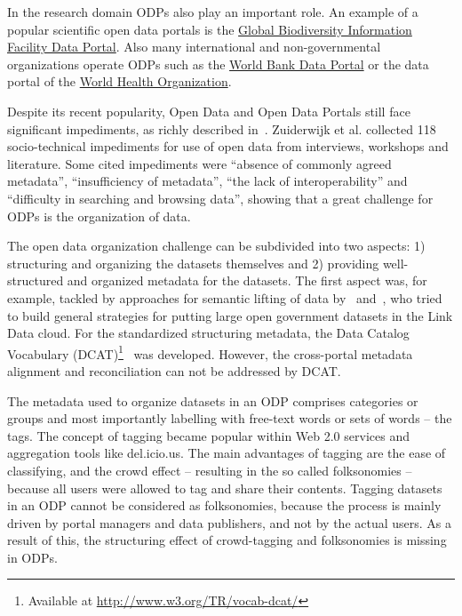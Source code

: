 \documentclass[conference]{IEEEtran}
\begin{document}
In the research domain ODPs also play an important role.
An example of a popular scientific open data portals is the \href{http://data.gbif.org}{Global Biodiversity Information Facility Data Portal}.
Also many international and non-governmental organizations operate ODPs such as the \href{http://data.worldbank.org}{World Bank Data Portal} or the data portal of the \href{http://apps.who.int/gho/data/}{World Health Organization}.

Despite its recent popularity, Open Data and Open Data Portals still face significant impediments, as richly described in~\cite{Zuiderwijk2012}.
Zuiderwijk et al. collected 118 socio-technical impediments for use of open data from interviews, workshops and literature.
Some cited impediments were ``absence of commonly agreed metadata'', ``insufficiency of metadata'', ``the lack of interoperability'' and ``difficulty in searching and browsing data'', showing that a great challenge for ODPs is the organization of data.

The open data organization challenge can be subdivided into two aspects: 1) structuring and organizing the datasets themselves and 2) providing well-structured and organized metadata for the datasets.
The first aspect was, for example, tackled by approaches for semantic lifting of data by~\cite{DBLP:conf/i-semantics/ErmilovAS13} and~\cite{Ding2011325}, who tried to build general strategies for putting large open government datasets in the Link Data cloud.
For the standardized structuring metadata, the Data Catalog Vocabulary (DCAT)\footnote{Available at \url{http://www.w3.org/TR/vocab-dcat/}}~\cite{conf/i-semantics/CyganiakMP10} was developed.
However, the cross-portal metadata alignment and reconciliation can not be addressed by DCAT.

The metadata used to organize datasets in an ODP comprises categories or groups and most importantly labelling with free-text words or sets of words -- the tags.
The concept of tagging became popular within Web 2.0 services and aggregation tools like del.icio.us. 
The main advantages of tagging are the ease of classifying, and the crowd effect -- resulting in the so called folksonomies -- because all users were allowed to tag and share their contents. 
Tagging datasets in an ODP cannot be considered as folksonomies, because the process is mainly driven by portal managers and data publishers, and not by the actual users.
As a result of this, the structuring effect of crowd-tagging and folksonomies is missing in ODPs.
\end{document}
